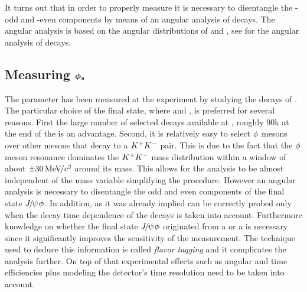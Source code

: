 It turns out that in order to properly measure \phis it is necessary to disentangle the \CP-odd and \CP-even
components by means of an angular analysis of \BsJpsiPhi decays. The angular analysis is based on the
angular distributions of \phiKK and \Jpsimumu, see  for the angular analysis
of \BsJpsiKst decays.

\subsection{Measuring $\boldsymbol{\phi_{s}}$}
\label{measuring_phis}

The parameter \phis has been measured at the \lhcb experiment by studying the decays of \BsJpsiPhi \cite{phis-3fb-paper}.
The particular choice of the final state, where \phiKK and \Jpsimumu, is preferred for several reasons. First the large number
of selected \BsJpsiPhi decays available at \lhcb, roughly $90$k at the end of the \runtwo is an advantage. Second, it is relatively
easy to select $\phi$ mesons over other mesons that decay to a $K^+K^-$ pair. This is due to the fact that the $\phi$ meson resonance dominates
the $K^+K^-$ mass distribution within a window of about $\pm 30 {\mathrm{\,Me\kern -0.1em V\!/}c^2}$ around its mass. This allows for the analysis to be
almost independent of the \mKK mass variable simplifying the procedure. However an angular analysis is necessary
to disentangle the odd and even \CP components of the final state ${J\mskip -3mu/\mskip -2mu\psi\mskip 2mu}\phi$.
In addition, as it was already implied \phis can be correctly probed only when the decay time dependence of the \BsJpsiPhi decays is taken into
account. Furthermore knowledge on whether the final state ${J\mskip -3mu/\mskip -2mu\psi\mskip 2mu}\phi$ originated from a \Bs or a \Bsb is necessary since it
significantly improves the sensitivity of the \phis measurement. The technique used to deduce this information is called {\it flavor tagging}
and it complicates the analysis further. On top of that experimental effects such as angular and time efficiencies plus modeling the
\lhcb detector's time resolution need to be taken into account.

